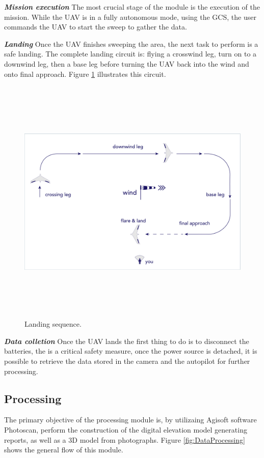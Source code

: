 \textit{\textbf{Mission execution}} \newline
The most crucial stage of the module is the execution of the mission. While the UAV is in a fully autonomous mode, using the GCS, the user commands the UAV to start the sweep to gather the data.

\textit{\textbf{Landing}} \newline
Once the UAV finishes sweeping the area, the next task to perform is a safe landing. The complete landing circuit is: flying a crosswind leg, turn on to a downwind leg, then a base leg before turning the UAV back into the wind and onto final approach. Figure \ref{fig:Landing} illustrates this circuit.
\begin{figure}[H]
\centering
\includegraphics[width=12cm,height=12cm,keepaspectratio]{imagenes/secuencia-aterrizaje-01.png}
\caption{Landing sequence.}
\label{fig:Landing}
\end{figure}

\textit{\textbf{Data colletion}} \newline
Once the UAV lands the first thing to do is to disconnect the batteries, the is a critical safety measure, once the power source is detached, it is possible to retrieve the data stored in the camera and the autopilot for further processing. 

\subsection{Processing}
The primary objective of the processing module is, by utilizaing Agisoft software Photoscan, perform the construction of the digital elevation model generating reports, as well as a 3D model from photographs. Figure \ref{fig:DataProcessing} shows the general flow of this module.

